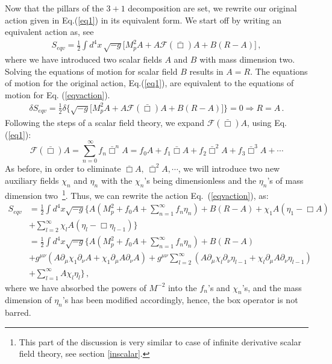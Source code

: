 \documentclass[a4paper,12pt]{article}
\newcommand{\bbox}{\bar{\Box}}
\newcommand{\+}{^{\dagger}}
\newcommand{\2}{\frac{1}{2}}
\newcommand{\3}{\frac{1}{3}}
\newcommand{\4}{\frac{1}{4}}
\newcommand{\6}{\frac{1}{6}}
\newcommand{\8}{\frac{1}{8}}
\newcommand{\non}{\nonumber\\}
\begin{document}
Now that the pillars of the $3+1$ decomposition are set, we  rewrite our original action given in Eq.(\ref{eq1})
in its equivalent form. We start off by writing an equivalent action as, see~\cite{Biswas:2005qr}
\begin{eqnarray}\label{eqvaction}
S_{eqv}=\frac{1}{2}\int d^{4}x \, \sqrt{-g}\bigg[M^{2}_{p}A+A\mathcal{F}(\bbox)A+B(R-A)\bigg]\,,
\end{eqnarray}
where we have introduced two scalar fields $A$ and $B$ with mass dimension two. Solving the equations of motion for scalar field $B$ results in $A=R$. The equations of motion for the original action, Eq.(\ref{eq1}),  are equivalent to the equations of motion for Eq. (\ref{eqvaction}).
%
\begin{eqnarray}
\delta S_{eqv}=\frac{1}{2}\delta\Bigg\{\sqrt{-g}\bigg[M^{2}_{p}A+A\mathcal{F}(\bbox)A+B(R-A)\bigg]\Bigg\}=0\Rightarrow R=A\,.
\end{eqnarray}
Following the steps of a scalar field theory, we  expand $\mathcal{F}(\bbox)A$, using Eq. (\ref{eq1}):
\begin{equation}
\mathcal{F}(\bbox)A=\sum^{\
\infty}_{n=0}f_{n}\bbox^{n}A=f_{0}A+f_{1}\bbox A+f_{2}\bbox^{2}A+f_{3}\bbox^{3}A+\cdots
\end{equation} 
As before, in order to eliminate  $\bbox A,~\bbox^{2}A, \cdots$, we will introduce two new auxiliary fields $\chi_n$ and $\eta_n$ with 
the $\chi_{n}$'s being dimensionless and the $\eta_{n}$'s of mass dimension two~\footnote{This part of the discussion is very similar to case of infinite derivative scalar field theory, see section \ref{inscalar}.}. 
Thus, we can rewrite the action Eq.~(\ref{eqvaction}), as:
\begin{align}\label{eqv2}
S_{eqv}&=\frac{1}{2}\int d^{4}x\sqrt{-g}\Bigg\{A(M^{2}_{p}+f_{0}A+\sum^{\infty}_{n=1}f_n\eta_{n})+B(R-A)+\chi_{1}A(\eta_{1}-\Box A)\non &
+\sum
^{\infty}_{l=2}\chi_lA(\eta_l-\Box \eta_{l-1})\Bigg\}
\nonumber\\&=
\frac{1}{2}\int d^{4}x\sqrt{-g}\Bigg\{A(M^{2}_{p}+f_{0}A+\sum^{\infty}_{n=1}f_n\eta_{n})+B(^{}R-A)\nonumber\\
&+g^{\mu\nu}(A\partial_\mu\chi_1  \partial_\nu A+\chi_1
\partial_\mu A
\partial_\nu A)+g^{\mu\nu}\sum^{\infty}_{l=2}(A\partial_\mu\chi_l  \partial_\nu\eta_{l-1}
+\chi_l
\partial_\mu A
\partial_\nu \eta_{l-1}) \nonumber \\
&+\sum ^{\infty}_{l=1}A\chi_l \eta_l 
\Bigg\}\,,
\end{align}
where we have absorbed the powers of $M^{-2}$ into the $f_{n}$'s and $\chi_{n}$'s,
 and the mass dimension of $\eta_{n}$'s has been modified accordingly, hence, the box operator is not barred.
\end{document}
